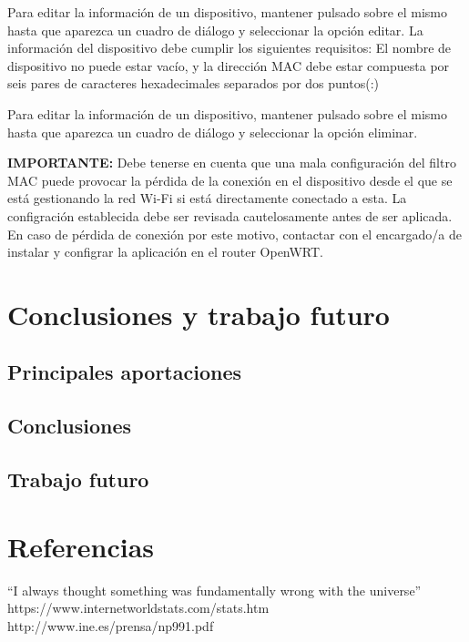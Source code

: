 \documentclass[12pt]{article}
\begin{document}
        Para editar la información de un dispositivo, mantener pulsado sobre el mismo hasta que aparezca un cuadro de diálogo y seleccionar la opción editar. La información del dispositivo debe cumplir los siguientes requisitos: El nombre de dispositivo no puede estar vacío, y la dirección MAC debe estar compuesta por seis pares de caracteres hexadecimales separados por dos puntos(:)

        Para editar la información de un dispositivo, mantener pulsado sobre el mismo hasta que aparezca un cuadro de diálogo y seleccionar la opción eliminar.

        \textbf{IMPORTANTE:} Debe tenerse en cuenta que una mala configuración del filtro MAC puede provocar la pérdida de la conexión en el dispositivo desde el que se está gestionando la red Wi-Fi si está directamente conectado a esta. La configración establecida debe ser revisada cautelosamente antes de ser aplicada. En caso de pérdida de conexión por este motivo, contactar con el encargado/a de instalar y configrar la aplicación en el router OpenWRT.

\section{Conclusiones y trabajo futuro}


    \subsection{Principales aportaciones}




    \subsection{Conclusiones}



    \subsection{Trabajo futuro}


\section{Referencias}
``I always thought something was fundamentally wrong with the universe'' \citep{adams1995hitchhiker}
https://www.internetworldstats.com/stats.htm \citep{hola}
http://www.ine.es/prensa/np991.pdf \citep{Menores que utilizan internet}
\end{document}
